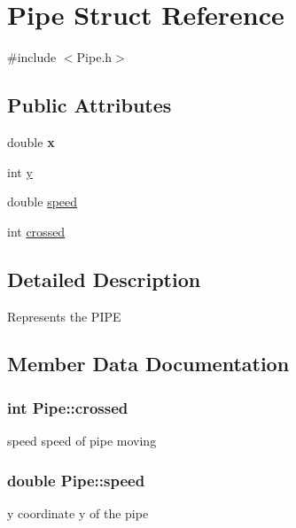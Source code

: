 \hypertarget{structPipe}{}\section{Pipe Struct Reference}
\label{structPipe}


{\ttfamily \#include $<$Pipe.\+h$>$}

\subsection*{Public Attributes}
\begin{DoxyCompactItemize}
\item 
double {\bfseries x}\hypertarget{structPipe_a6f5f22f0eedf3252722cb2f2841f76e9}{}\label{structPipe_a6f5f22f0eedf3252722cb2f2841f76e9}

\item 
int \hyperlink{structPipe_a250b5faa31ebaa60ca8def2cbf193844}{y}
\item 
double \hyperlink{structPipe_a11aa1aa5ae2d6265db4cbc3dda09c0b1}{speed}
\item 
int \hyperlink{structPipe_a68e72d3f16e0de0f40ac8c85832dbdc5}{crossed}
\end{DoxyCompactItemize}


\subsection{Detailed Description}
Represents the P\+I\+PE 

\subsection{Member Data Documentation}
\subsubsection[{\texorpdfstring{crossed}{crossed}}]{\setlength{\rightskip}{0pt plus 5cm}int Pipe\+::crossed}\hypertarget{structPipe_a68e72d3f16e0de0f40ac8c85832dbdc5}{}\label{structPipe_a68e72d3f16e0de0f40ac8c85832dbdc5}
speed speed of pipe moving 
\subsubsection[{\texorpdfstring{speed}{speed}}]{\setlength{\rightskip}{0pt plus 5cm}double Pipe\+::speed}\hypertarget{structPipe_a11aa1aa5ae2d6265db4cbc3dda09c0b1}{}\label{structPipe_a11aa1aa5ae2d6265db4cbc3dda09c0b1}
y coordinate y of the pipe 
